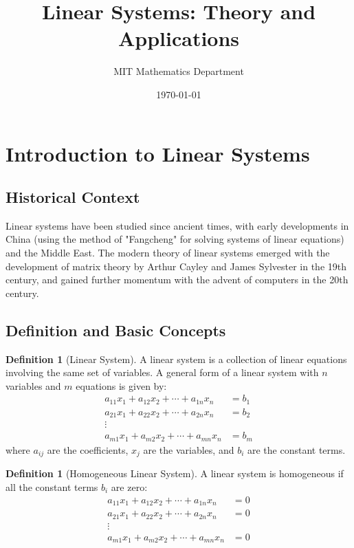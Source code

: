 \documentclass[12pt,a4paper]{article}
\title{Linear Systems: Theory and Applications}
\author{MIT Mathematics Department}
\date{\today}
\theoremstyle{plain}
\theoremstyle{definition}
\newtheorem{definition}[theorem]{Definition}
\begin{document}
\maketitle
\tableofcontents
\newpage

\section{Introduction to Linear Systems}

\subsection{Historical Context}

Linear systems have been studied since ancient times, with early developments in China (using the method of "Fangcheng" for solving systems of linear equations) and the Middle East. The modern theory of linear systems emerged with the development of matrix theory by Arthur Cayley and James Sylvester in the 19th century, and gained further momentum with the advent of computers in the 20th century.

\subsection{Definition and Basic Concepts}

\begin{definition}[Linear System]
A linear system is a collection of linear equations involving the same set of variables. A general form of a linear system with $n$ variables and $m$ equations is given by:
\begin{align}
a_{11}x_1 + a_{12}x_2 + \cdots + a_{1n}x_n &= b_1 \\
a_{21}x_1 + a_{22}x_2 + \cdots + a_{2n}x_n &= b_2 \\
\vdots \\
a_{m1}x_1 + a_{m2}x_2 + \cdots + a_{mn}x_n &= b_m
\end{align}
where $a_{ij}$ are the coefficients, $x_j$ are the variables, and $b_i$ are the constant terms.
\end{definition}

\begin{definition}[Homogeneous Linear System]
A linear system is homogeneous if all the constant terms $b_i$ are zero:
\begin{align}
a_{11}x_1 + a_{12}x_2 + \cdots + a_{1n}x_n &= 0 \\
a_{21}x_1 + a_{22}x_2 + \cdots + a_{2n}x_n &= 0 \\
\vdots \\
a_{m1}x_1 + a_{m2}x_2 + \cdots + a_{mn}x_n &= 0
\end{align}
\end{definition}
\end{document}
